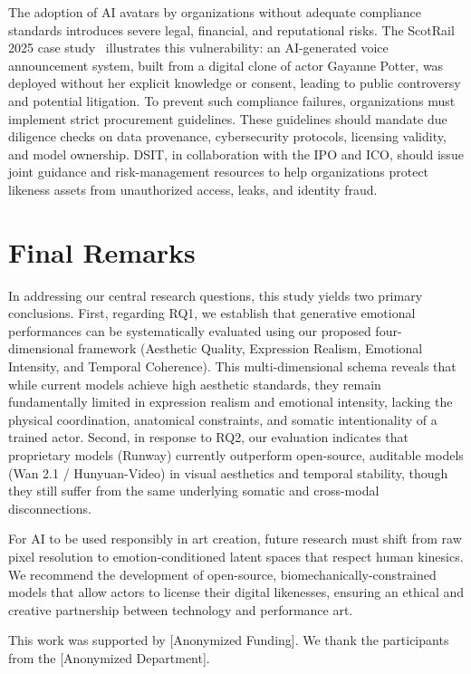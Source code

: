 \documentclass[pdflatex,sn-mathphys-num]{sn-jnl}
\theoremstyle{thmstyleone}
\theoremstyle{thmstyletwo}
\theoremstyle{thmstylethree}
\begin{document}
The adoption of AI avatars by organizations without adequate compliance standards introduces severe legal, financial, and reputational risks. The ScotRail 2025 case study~\cite{pavis2025ai, signapselinkedin} illustrates this vulnerability: an AI-generated voice announcement system, built from a digital clone of actor Gayanne Potter, was deployed without her explicit knowledge or consent, leading to public controversy and potential litigation. To prevent such compliance failures, organizations must implement strict procurement guidelines. These guidelines should mandate due diligence checks on data provenance, cybersecurity protocols, licensing validity, and model ownership. DSIT, in collaboration with the IPO and ICO, should issue joint guidance and risk-management resources to help organizations protect likeness assets from unauthorized access, leaks, and identity fraud.

\section{Final Remarks}\label{sec6}
In addressing our central research questions, this study yields two primary conclusions. First, regarding RQ1, we establish that generative emotional performances can be systematically evaluated using our proposed four-dimensional framework (Aesthetic Quality, Expression Realism, Emotional Intensity, and Temporal Coherence). This multi-dimensional schema reveals that while current models achieve high aesthetic standards, they remain fundamentally limited in expression realism and emotional intensity, lacking the physical coordination, anatomical constraints, and somatic intentionality of a trained actor. Second, in response to RQ2, our evaluation indicates that proprietary models (Runway) currently outperform open-source, auditable models (Wan 2.1 / Hunyuan-Video) in visual aesthetics and temporal stability, though they still suffer from the same underlying somatic and cross-modal disconnections.

For AI to be used responsibly in art creation, future research must shift from raw pixel resolution to emotion-conditioned latent spaces that respect human kinesics. We recommend the development of open-source, biomechanically-constrained models that allow actors to license their digital likenesses, ensuring an ethical and creative partnership between technology and performance art.

This work was supported by [Anonymized Funding]. We thank the participants from the [Anonymized Department].


\end{document}
